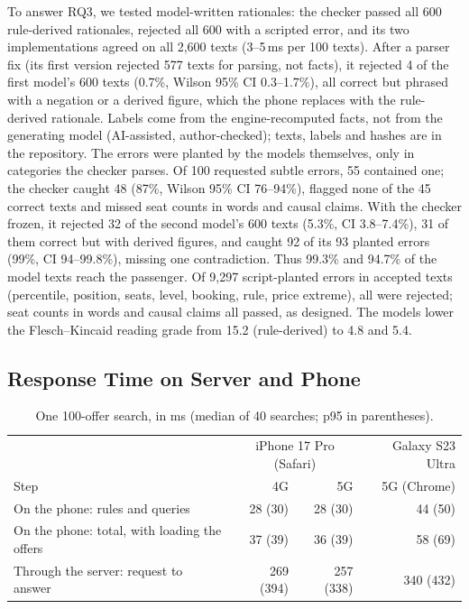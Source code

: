 \documentclass{svproc}
\begin{document}
To answer RQ3, we tested model-written rationales: the checker passed all 600 rule-derived rationales, rejected all 600 with a scripted error, and its two implementations agreed on all 2,600 texts (3--5\,ms per 100 texts). After a parser fix (its first version rejected 577 texts for parsing, not facts), it rejected 4 of the first model's 600 texts (0.7\%, Wilson 95\% CI 0.3--1.7\%), all correct but phrased with a negation or a derived figure, which the phone replaces with the rule-derived rationale. Labels come from the engine-recomputed facts, not from the generating model (AI-assisted, author-checked); texts, labels and hashes are in the repository. The errors were planted by the models themselves, only in categories the checker parses. Of 100 requested subtle errors, 55 contained one; the checker caught 48 (87\%, Wilson 95\% CI 76--94\%), flagged none of the 45 correct texts and missed seat counts in words and causal claims. With the checker frozen, it rejected 32 of the second model's 600 texts (5.3\%, CI 3.8--7.4\%), 31 of them correct but with derived figures, and caught 92 of its 93 planted errors (99\%, CI 94--99.8\%), missing one contradiction. Thus 99.3\% and 94.7\% of the model texts reach the passenger. Of 9,297 script-planted errors in accepted texts (percentile, position, seats, level, booking, rule, price extreme), all were rejected; seat counts in words and causal claims all passed, as designed. The models lower the Flesch--Kincaid reading grade from 15.2 (rule-derived) to 4.8 and 5.4.

\subsection{Response Time on Server and Phone}\label{sec:rq4}
\begin{table}[t]
  \caption{One 100-offer search, in ms (median of 40 searches; p95 in parentheses).}
  \label{tab:phone}
  \centering\scriptsize
  \begin{tabular}{@{}lrrr@{}}
    \toprule
     & \multicolumn{2}{c}{iPhone 17 Pro (Safari)} & Galaxy S23 Ultra \\
    Step & 4G & 5G & 5G (Chrome) \\
    \midrule
    On the phone: rules and queries & 28 (30) & 28 (30) & 44 (50) \\
    On the phone: total, with loading the offers & 37 (39) & 36 (39) & 58 (69) \\
    Through the server: request to answer & 269 (394) & 257 (338) & 340 (432) \\
    \bottomrule
  \end{tabular}
\end{table}
\end{document}
